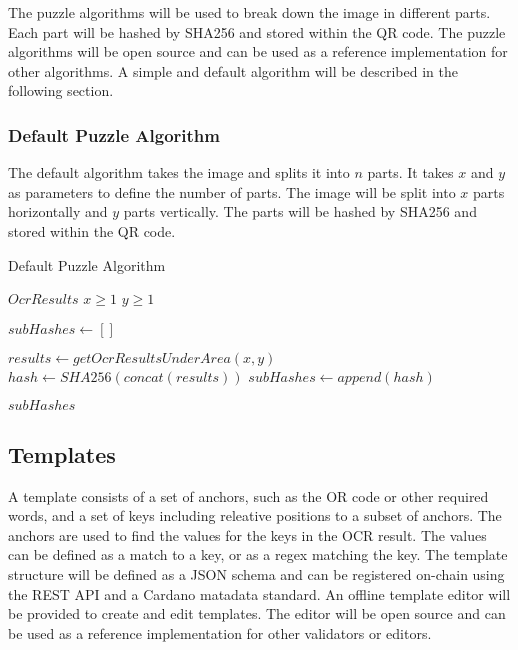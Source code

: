 \documentclass[../ockr-specification.tex]{subfiles}
\begin{document}
The puzzle algorithms will be used to break down the image in different parts. Each part will be hashed by SHA256 and stored within the QR code. The puzzle algorithms will be open source and can be used as a reference implementation for other algorithms. A simple and default algorithm will be described in the following section.

\subsubsection{Default Puzzle Algorithm}

The default algorithm takes the image and splits it into $n$ parts. It takes $x$ and $y$ as parameters to define the number of parts. The image will be split into $x$ parts horizontally and $y$ parts vertically. The parts will be hashed by SHA256 and stored within the QR code. 

\begin{algorithm}[H]
    \caption{Default Puzzle Algorithm}\label{alg:cap}
    \begin{algorithmic}
    \Require $OcrResults$
    \Require $x \geq 1$
    \Require $y \geq 1$
    
    \State $subHashes \gets []$

            \State $results \gets getOcrResultsUnderArea(x, y)$
            \State $hash \gets SHA256(concat(results))$
            \State $subHashes \gets append(hash)$
        \EndFor
    \EndFor

    \State \Return $subHashes$

    \end{algorithmic}
\end{algorithm}

\subsection{Templates}

A template consists of a set of anchors, such as the OR code or other required words, and a set of keys including releative positions to a subset of anchors. The anchors are used to find the values for the keys in the OCR result. The values can be defined as a match to a key, or as a regex matching the key. The template structure will be defined as a JSON schema and can be registered on-chain using the REST API and a Cardano matadata standard. An offline template editor will be provided to create and edit templates. The editor will be open source and can be used as a reference implementation for other validators or editors.
\end{document}
